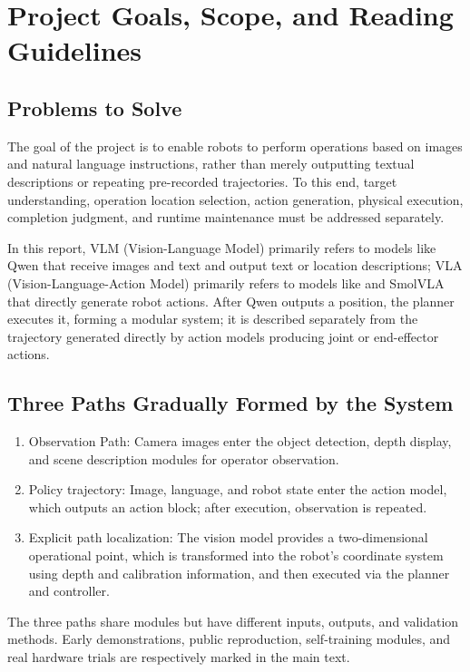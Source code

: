 \chapter{Project Goals, Scope, and Reading Guidelines}
\section{Problems to Solve}
The goal of the project is to enable robots to perform operations based on images and natural language instructions, rather than merely outputting textual descriptions or repeating pre-recorded trajectories. To this end, target understanding, operation location selection, action generation, physical execution, completion judgment, and runtime maintenance must be addressed separately.

In this report, VLM (Vision-Language Model) primarily refers to models like Qwen that receive images and text and output text or location descriptions; VLA (Vision-Language-Action Model) primarily refers to models like \pifive{} and SmolVLA that directly generate robot actions. After Qwen outputs a position, the planner executes it, forming a modular system; it is described separately from the trajectory generated directly by action models producing joint or end-effector actions.
\section{Three Paths Gradually Formed by the System}
\begin{enumerate}
\item Observation Path: Camera images enter the object detection, depth display, and scene description modules for operator observation.
\item Policy trajectory: Image, language, and robot state enter the action model, which outputs an action block; after execution, observation is repeated.
\item Explicit path localization: The vision model provides a two-dimensional operational point, which is transformed into the robot's coordinate system using depth and calibration information, and then executed via the planner and controller.
\end{enumerate}
The three paths share modules but have different inputs, outputs, and validation methods. Early demonstrations, public reproduction, self-training modules, and real hardware trials are respectively marked in the main text.
